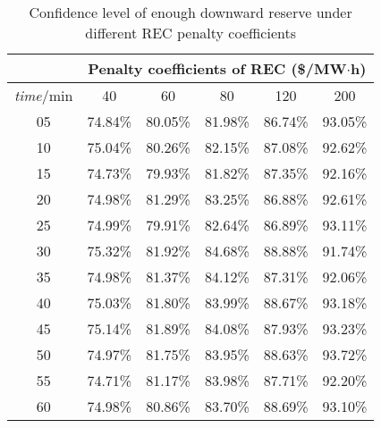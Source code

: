 \begin{table}[h]
	\caption{Confidence level of enough downward reserve under different REC penalty coefficients}
	\label{aci}
	\begin{center}
		\begin{tabular}{|c|c|c|c|c|c|}
			\hline
			{} & \multicolumn{5}{c|}{Penalty coefficients of REC (\$/MW$\cdot$h)}\\
			\hline
			{{\it time}/min} & {40} & {60} & {80} & {120} & {200}\\
			\hline
			05 & 74.84\% & 80.05\% & 81.98\% & 86.74\% & 93.05\% \\
			10 & 75.04\% & 80.26\% & 82.15\% & 87.08\% & 92.62\% \\
			15 & 74.73\% & 79.93\% & 81.82\% & 87.35\% & 92.16\% \\
			20 & 74.98\% & 81.29\% & 83.25\% & 86.88\% & 92.61\% \\
			25 & 74.99\% & 79.91\% & 82.64\% & 86.89\% & 93.11\% \\
			30 & 75.32\% & 81.92\% & 84.68\% & 88.88\% & 91.74\% \\
			35 & 74.98\% & 81.37\% & 84.12\% & 87.31\% & 92.06\% \\
			40 & 75.03\% & 81.80\% & 83.99\% & 88.67\% & 93.18\% \\
			45 & 75.14\% & 81.89\% & 84.08\% & 87.93\% & 93.23\% \\
			50 & 74.97\% & 81.75\% & 83.95\% & 88.63\% & 93.72\% \\
			55 & 74.71\% & 81.17\% & 83.98\% & 87.71\% & 92.20\% \\
			60 & 74.98\% & 80.86\% & 83.70\% & 88.69\% & 93.10\% \\
			\hline
		\end{tabular}
	\end{center}
\end{table}
